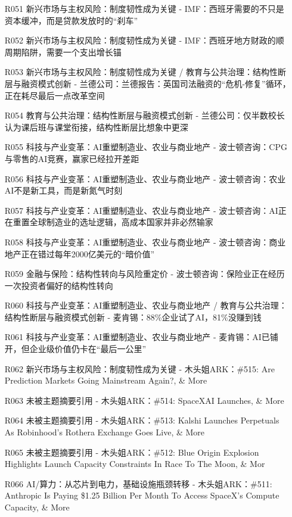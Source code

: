 \documentclass[11pt]{ctexart}
\begin{document}
\begin{itemize}
  \item [R051] 新兴市场与主权风险：制度韧性成为关键 - IMF：西班牙需要的不只是资本缓冲，而是贷款发放时的“刹车”
  \item [R052] 新兴市场与主权风险：制度韧性成为关键 - IMF：西班牙地方财政的顺周期陷阱，需要一个支出增长锚
  \item [R053] 新兴市场与主权风险：制度韧性成为关键 / 教育与公共治理：结构性断层与融资模式创新 - 兰德公司：兰德报告：英国司法融资的“危机-修复”循环，正在耗尽最后一点改革空间
  \item [R054] 教育与公共治理：结构性断层与融资模式创新 - 兰德公司：仅半数校长认为课后班与课堂衔接，结构性断层比想象中更深
  \item [R055] 科技与产业变革：AI重塑制造业、农业与商业地产 - 波士顿咨询：CPG与零售的AI竞赛，赢家已经拉开差距
  \item [R056] 科技与产业变革：AI重塑制造业、农业与商业地产 - 波士顿咨询：农业AI不是新工具，而是新氮气时刻
  \item [R057] 科技与产业变革：AI重塑制造业、农业与商业地产 - 波士顿咨询：AI正在重置全球制造业的选址逻辑，高成本国家并非必然输家
  \item [R058] 科技与产业变革：AI重塑制造业、农业与商业地产 - 波士顿咨询：商业地产正在错过每年2000亿美元的“暗价值”
  \item [R059] 金融与保险：结构性转向与风险重定价 - 波士顿咨询：保险业正在经历一次投资者偏好的结构性转向
  \item [R060] 科技与产业变革：AI重塑制造业、农业与商业地产 / 教育与公共治理：结构性断层与融资模式创新 - 麦肯锡：88\%企业试了AI，81\%没赚到钱
  \item [R061] 科技与产业变革：AI重塑制造业、农业与商业地产 - 麦肯锡：AI已铺开，但企业级价值仍卡在“最后一公里”
  \item [R062] 新兴市场与主权风险：制度韧性成为关键 - 木头姐ARK：\#515: Are Prediction Markets Going Mainstream Again?, \& More
  \item [R063] 未被主题摘要引用 - 木头姐ARK：\#514: SpaceXAI Launches, \& More
  \item [R064] 未被主题摘要引用 - 木头姐ARK：\#513: Kalshi Launches Perpetuals As Robinhood’s Rothera Exchange Goes Live, \& More
  \item [R065] 未被主题摘要引用 - 木头姐ARK：\#512: Blue Origin Explosion Highlights Launch Capacity Constraints In Race To The Moon, \& Mor
  \item [R066] AI/算力：从芯片到电力，基础设施瓶颈转移 - 木头姐ARK：\#511: Anthropic Is Paying \$1.25 Billion Per Month To Access SpaceX’s Compute Capacity, \& More
\end{itemize}
\end{document}
